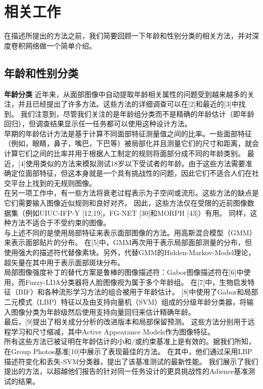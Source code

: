 \documentclass{article}
\begin{document}
\section{相关工作}
在描述所提出的方法之前，我们简要回顾一下年龄和性别分类的相关方法，并对深度卷积网络做一个简单介绍。
\subsection{年龄和性别分类}
\textbf{年龄分类}
近年来，从面部图像中自动提取年龄相关属性的问题受到越来越多的关注，并且已经提出了许多方法。这些方法的详细调查可以在[2]和最近的[3]中找到。
我们注意到，尽管我们关注的是年龄组分类而不是精确的年龄估计（即年龄回归），但调查结果显示任一任务都可以使用这种设计方法。\\

早期的年龄估计方法是基于计算不同面部特征测量值之间的比率。一些面部特征（例如，眼睛，鼻子，嘴巴，下巴等）被局部化并且测量它们的尺寸和距离，就会计算它们之间的比率并用于根据人工制定的规则将面部分成不同的年龄类别。
最近，[4]使用类似的方法来模拟测试18岁以下受试者的年龄。由于这些方法需要准确定位面部特征，但这本身就是一个具有挑战性的问题，因此它们不适合人们在社交平台上找到的无规则图像。\\

在另一项工作中，有一些方法将衰老过程表示为子空间或流形。这些方法的缺点是它们需要输入图像近似规则和良好对齐。
因此，这些方法仅在受限的近前图像数据集（例如UIUC-IFP-Y [12,19]，FG-NET [30]和MORPH [43]）有用。
同样，这种方法不适合于不受约束的图像。\\

与上述不同的是使用局部特征来表示面部图像的方法。用高斯混合模型（GMM）来表示面部贴片的分布。
在[5]中，GMM再次用于表示局部面部测量的分布，但使用强大的描述符代替像素块。另外，代替GMM的Hidden-Markov-Model理论，超矢量在其中用于表示面部斑块分布。\\

局部图像强度补丁的替代方案是鲁棒的图像描述符：Gabor图像描述符在[6]中使用，而Fuzzy-LDA分类器将人脸图像视为属于多个年龄组。
在[7]中，生物启发特征（BIF）和各种流形学习方法的组合被用于年龄估计。 
[8]中使用了Gabor和局部二元模式（LBP）特征以及由支持向量机（SVM）组成的分级年龄分类器，将输入图像分类为年龄级然后使用支持向量回归来估计精确年龄。\\

最后，[9]提出了相关成分分析的改进版本和局部保留预测。
这些方法分别用于远程学习和尺寸缩减，其中Active Appearance Models作为图像特征。\\

所有这些方法已被证明在年龄估计的小和/或约束基准上是有效的。据我们所知，在Group Photos基准[10]中展示了表现最佳的方法。
在其中，他们通过采用LBP描述符变化和丢失-SVM分类器，提出了该基准测试的最新性能。
我们展示了我们提出的方法，以超越他们报告的针对同一任务设计的更具挑战性的Adience基准测试的结果。\\
\end{document}
